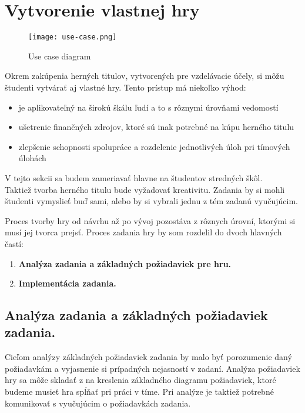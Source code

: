\section{Vytvorenie vlastnej hry}\label{vytvorenie-vlastnej-hry}

\begin{figure}
	\texttt{[image: use-case.png]}
	\caption{Use case diagram}
	\label{use-case-tvorba-hry}
\end{figure}


Okrem zakúpenia herných titulov, vytvorených pre vzdelávacie účely, si môžu študenti vytvárať aj vlastné hry.
Tento prístup má niekoľko výhod: 
	\begin{itemize}
		\item je aplikovateľný na širokú škálu ľudí a to s rôznymi úrovňami vedomostí
		\item ušetrenie finančných zdrojov, ktoré sú inak potrebné na kúpu herného titulu
		\item zlepšenie schopnosti spolupráce a rozdelenie jednotlivých úloh pri tímových úlohách 
	\end{itemize}

V tejto sekcii sa budem zameriavať hlavne na študentov stredných škôl.\\

Taktiež tvorba herného titulu bude vyžadovať kreativitu.
Zadania by si mohli študenti vymyslieť buď sami, alebo by si vybrali jednu z tém zadanú vyučujúcim.

Proces tvorby hry od návrhu až po vývoj pozostáva z rôznych úrovní, ktorými si musí jej tvorca prejsť.
Proces zadania hry by som rozdelil do dvoch hlavných častí:
	\begin{enumerate}
		\item \textbf{Analýza zadania a základných požiadaviek pre hru.}
		\item \textbf{Implementácia zadania.}
	\end{enumerate}


	\subsection{Analýza zadania a základných požiadaviek zadania.}\label{analyza-zadania}
	Cieľom analýzy základných požiadaviek zadania by malo byť porozumenie 
	daný požiadavkám a vyjasnenie si prípadných nejasností v zadaní. Analýza požiadaviek 
	hry sa môže skladať z na kreslenia základného diagramu požiadaviek,
	ktoré budeme musieť hra spĺňať pri práci v tíme. Pri analýze je taktiež potrebné komunikovať 
	s vyučujúcim o požiadavkách zadania. 


